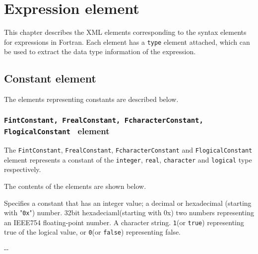 \section{Expression element}

This chapter describes the XML elements corresponding to the syntax elements for expressions in Fortran.
Each element has a {\tt type} element attached, which can be used to extract the data type information of the expression.

\subsection{Constant element}

The elements representing constants are described below.

\subsubsection{ {\tt FintConstant, FrealConstant, FcharacterConstant, FlogicalConstant } element}

The {\tt FintConstant}, {\tt FrealConstant}, {\tt FcharacterConstant} and {\tt FlogicalConstant} element represents a constant of the {\tt integer}, {\tt real}, {\tt character} and {\tt logical} type respectively.
\newline

The contents of the elements are shown below.
\newline

\begin{XcodeMLElementList}
{Specifies a constant that has an integer value;
 a decimal or hexadecimal (starting with "{\tt 0x}") number.}
{32bit hexadeciaml(starting with 0x) two numbers representing an IEEE754 floating-point number.}
{A character string.}
{{\tt 1}(or {\tt true}) representing true of the logical value, or {\tt 0}(or {\tt false}) representing false.}
\end{XcodeMLElementList}


\begin{XcodeMLChildElements}
\XcodeMLElementDef{-}
{-}{-}
\end{XcodeMLChildElements}

